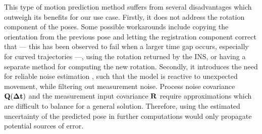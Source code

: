 This type of motion prediction method suffers from several disadvantages which outweigh its benefits for our use case. Firstly, it does not address the rotation component of the poses. Some possible workarounds include copying the orientation from the previous pose and letting the registration component correct that --- this has been observed to fail when a larger time gap occurs, especially for curved trajectories  ---, using the rotation returned by the INS, or having a separate method for computing the new rotation. Secondly, it introduces the need for reliable noise estimation , such that the model is reactive to unexpected movement, while filtering out measurement noise. Process noise covariance $\mathbf{Q(\Delta t)}$ and the measurement input covariance $\mathbf{R}$ require approximations which are difficult to balance for a general solution. Therefore, using the estimated uncertainty of the predicted pose in further computations would only propagate potential sources of error.

